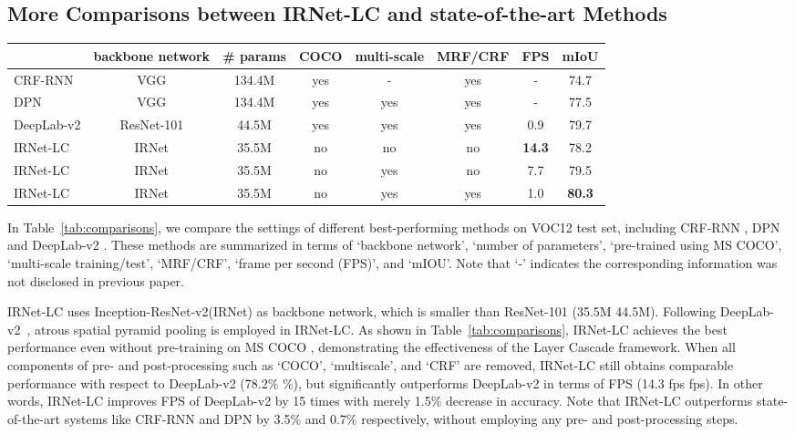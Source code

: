 \documentclass[10pt,twocolumn,letterpaper]{article}
\begin{document}
\subsection{More Comparisons between IRNet-LC and state-of-the-art Methods}

\begin{table*}[t]
  \caption{Comparisons with state-of-the-art methods on VOC12 \textit{test set}. `-' indicates the corresponding information was not disclosed in the previous papers.}
\centering
  \begin{tabular}{l|c|c|c|c|c|c|c}
      \hline
      &backbone network&\# params&COCO&multi-scale&MRF/CRF&FPS&mIoU\\
      \hline\hline
      CRF-RNN \cite{zheng2015conditional}&VGG \cite{simonyan2014very}&134.4M&yes&-&yes&-&74.7\\
      DPN \cite{liu2015semantic}&VGG \cite{simonyan2014very} &134.4M&yes&yes&yes&-&77.5\\
DeepLab-v2 \cite{CP2016Deeplab}&ResNet-101 \cite{He2015}&44.5M&yes&yes&yes&0.9&79.7\\
\hline\hline
      IRNet-LC&IRNet \cite{szegedy2016inception}&35.5M&no&no&no&\textbf{14.3}&78.2\\
      IRNet-LC&IRNet \cite{szegedy2016inception}&35.5M&no&yes&no&7.7&79.5\\
      IRNet-LC&IRNet \cite{szegedy2016inception}&35.5M&no&yes&yes&1.0&\textbf{80.3}\\
      \hline
  \end{tabular}
  \label{tab:comparisons}
\end{table*}


In Table~\ref{tab:comparisons}, we compare the settings of different best-performing methods on VOC12 \cite{everingham2010pascal} test set, including CRF-RNN \cite{zheng2015conditional}, DPN \cite{liu2015semantic} and DeepLab-v2 \cite{CP2016Deeplab}.
These methods are summarized in terms of `backbone network', `number of parameters', `pre-trained using MS COCO', `multi-scale training/test', `MRF/CRF', `frame per second (FPS)', and `mIOU'.
Note that `-' indicates the corresponding information was not disclosed in previous paper.

IRNet-LC uses Inception-ResNet-v2(IRNet) \cite{szegedy2016inception} as backbone network, which is smaller than ResNet-101 (35.5M \vs 44.5M).
Following DeepLab-v2~\cite{CP2016Deeplab}, atrous spatial pyramid pooling is employed in IRNet-LC.
As shown in Table~\ref{tab:comparisons}, IRNet-LC achieves the best performance even without pre-training on MS COCO \cite{lin2014microsoft}, demonstrating the effectiveness of the Layer Cascade framework. 
When all components of pre- and post-processing such as `COCO', `multiscale', and `CRF' are removed, IRNet-LC still obtains comparable performance with respect to DeepLab-v2 (78.2\% \%), but significantly outperforms DeepLab-v2 in terms of FPS (14.3 fps  fps).
In other words, IRNet-LC improves FPS of DeepLab-v2 by 15 times with merely 1.5\% decrease in accuracy.
Note that IRNet-LC outperforms state-of-the-art systems like CRF-RNN and DPN by 3.5\% and 0.7\% respectively, without employing any pre- and post-processing steps.
\end{document}

